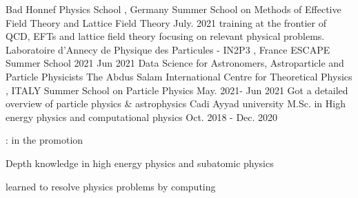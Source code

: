 

\begin{cventries}
\cventry
   {Bad Honnef Physics School , Germany} %
       {Summer School on Methods of Effective Field Theory and Lattice Field Theory } %
   {} %
   {July. 2021} %
   {training at the frontier of QCD, EFTs and lattice field theory focusing on relevant physical problems.}
           \cventry
    {Laboratoire d'Annecy de Physique des Particules - IN2P3 , France} %
        {ESCAPE Summer School 2021 } %
    {} %
    { Jun 2021} %
    {Data Science for Astronomers, Astroparticle and Particle Physicists}
           \cventry
    {The Abdus Salam International Centre for Theoretical Physics , ITALY} %
        {Summer School on Particle Physics} %
    {} %
    {May. 2021- Jun 2021} %
    {Got a detailed overview of particle physics \& astrophysics }
  \cventry
    {Cadi Ayyad university} 
     {M.Sc. in High energy physics and computational physics }%
    {} %
    {Oct. 2018 - Dec. 2020} %
    {
      \begin{cvitems} %
       \item {:  in the promotion}
        \item {Depth knowledge in high energy physics and subatomic physics}
        \item {learned  to resolve physics problems by computing }
      \end{cvitems}
    }
\end{cventries}

